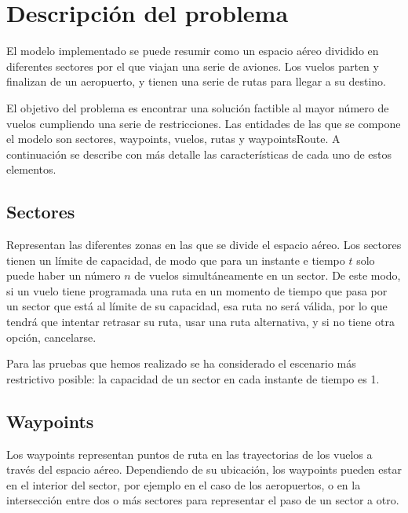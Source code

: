 \chapter{Descripción del problema}
\label{descripción}
El modelo implementado se puede resumir como un espacio aéreo dividido en diferentes sectores por el que viajan una serie de aviones. Los vuelos parten y finalizan de un aeropuerto, y tienen una serie de rutas para llegar a su destino.

El objetivo del problema es encontrar una solución factible al mayor número de vuelos cumpliendo una serie de restricciones. Las entidades de las que se compone el modelo son sectores, waypoints, vuelos, rutas y waypointsRoute. A continuación se describe con más detalle las características de cada uno de estos elementos.


\section{Sectores}
Representan las diferentes zonas en las que se divide el espacio aéreo. Los sectores tienen un límite de capacidad, de modo que para un instante e tiempo $t$ solo puede haber un número $n$ de vuelos simultáneamente en un sector. De este modo, si un vuelo tiene programada una ruta en un momento de tiempo que pasa por un sector que está al límite de su capacidad, esa ruta no será válida, por lo que tendrá que intentar retrasar su ruta, usar una ruta alternativa, y si no tiene otra opción, cancelarse.

Para las pruebas que hemos realizado se ha considerado el escenario más restrictivo posible: la capacidad de un sector en cada instante de tiempo es 1.

\section{Waypoints}
Los waypoints representan puntos de ruta en las trayectorias de los vuelos a través del espacio aéreo. Dependiendo de su ubicación, los waypoints pueden estar en el interior del sector, por ejemplo en el caso de los aeropuertos, o en la intersección entre dos o más sectores para representar el paso de un sector a otro.


